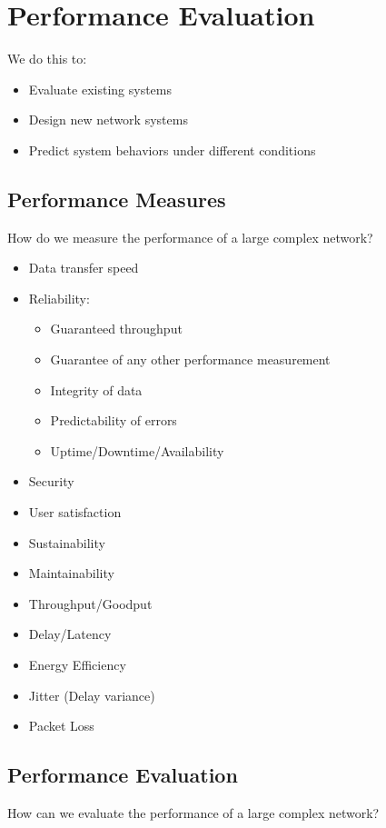 \section{Performance Evaluation}\label{sec:Performance_Evaluation}
We do this to:
\begin{itemize}[noitemsep]
\item Evaluate existing systems
\item Design new network systems
\item Predict system behaviors under different conditions
\end{itemize}

\subsection{Performance Measures}\label{subsec:Performance_Measures}
How do we measure the performance of a large complex network?

\begin{itemize}[noitemsep]
\item Data transfer speed
\item Reliability:
  \begin{itemize}[noitemsep]
  \item Guaranteed throughput
  \item Guarantee of any other performance measurement
  \item Integrity of data
  \item Predictability of errors
  \item Uptime/Downtime/Availability
  \end{itemize}

\item Security
\item User satisfaction
\item Sustainability
\item Maintainability
\item Throughput/Goodput
\item Delay/Latency
\item Energy Efficiency
\item Jitter (Delay variance)
\item Packet Loss
\end{itemize}

\subsection{Performance Evaluation}\label{subsec:Performance_Evaluation}
How can we evaluate the performance of a large complex network?


